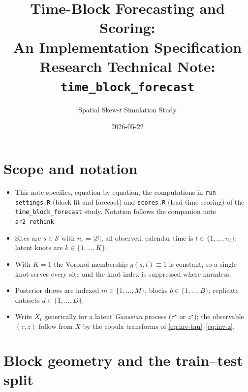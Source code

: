 \documentclass[11pt]{article}
\title{
  Time-Block Forecasting and Scoring:\\
  An Implementation Specification\\[4pt]
  \large Research Technical Note: \texttt{time\_block\_forecast}
}
\author{Spatial Skew-$t$ Simulation Study}
\date{2026-05-22}
\begin{document}
\maketitle

\section{Scope and notation}

\begin{itemize}[leftmargin=1.4em]
  \item This note specifies, equation by equation, the computations
        in \texttt{run-settings.R} (block fit and forecast) and
        \texttt{scores.R} (lead-time scoring) of the
        \texttt{time\_block\_forecast} study. Notation follows the
        companion note \texttt{ar2\_rethink}.
  \item Sites are $s\in\mathcal S$ with $n_s=|\mathcal S|$, all
        observed; calendar time is $t\in\{1,\dots,n_t\}$; latent knots
        are $k\in\{1,\dots,K\}$.
  \item With $K=1$ the Voronoi membership $g(s,t)\equiv 1$ is constant,
        so a single knot serves every site and the knot index is
        suppressed where harmless.
  \item Posterior draws are indexed $m\in\{1,\dots,M\}$, blocks
        $b\in\{1,\dots,B\}$, replicate datasets $d\in\{1,\dots,D\}$.
  \item Write $X_t$ generically for a latent \emph{Gaussian} process
        ($\tau^\star$ or $z^\star$); the observable $(\tau,z)$ follow
        from $X$ by the copula transforms of
        \eqref{eq:inv-tau}--\eqref{eq:inv-z}.
\end{itemize}

\section{Block geometry and the train--test split}
\end{document}
